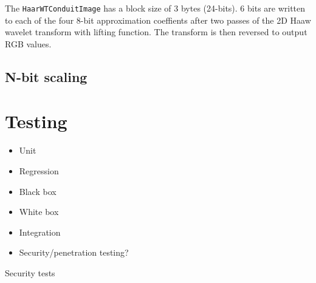 The {\tt HaarWTConduitImage} has a block size of 3 bytes (24-bits). 6 bits are written to each of the four 8-bit approximation coeffients after two passes of the 2D Haaw wavelet transform with lifting function. The transform is then reversed to output RGB values.


\FloatBarrier
\subsection{N-bit scaling}



    
    

\FloatBarrier
\section{Testing}
    \begin{itemize}
        \item Unit
        \item Regression
        \item Black box
        \item White box
        \item Integration
        \item Security/penetration testing?
    \end{itemize}
    
    Security tests
    
